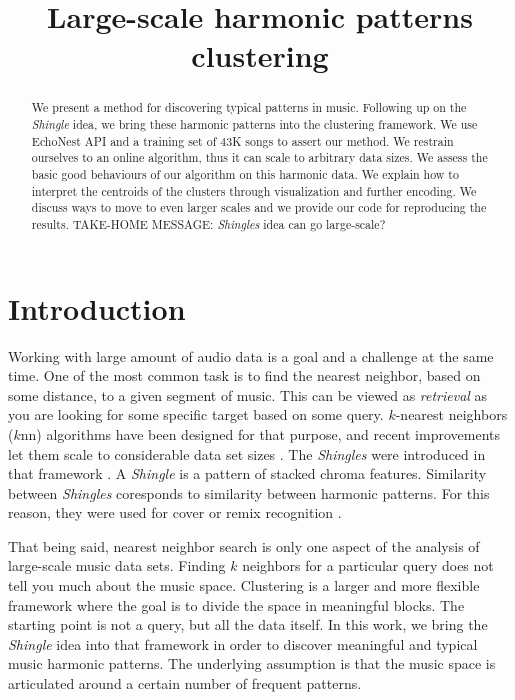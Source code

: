 \documentclass{article}
\title{Large-scale harmonic patterns clustering}
\begin{document}
%
\maketitle
%
\begin{abstract}
We present a method for discovering typical patterns in music.
Following up on the \textit{Shingle} idea, we bring these harmonic patterns
into the clustering framework. We use EchoNest API and a training set
of $43$K songs to assert our method. We restrain ourselves to an online
algorithm, thus it can scale to arbitrary data sizes.
We assess the basic good behaviours of our algorithm on this harmonic
data. We explain how to interpret the centroids of the clusters through
visualization and further encoding. We discuss ways to move to even larger
scales and we provide our code for reproducing the results.
TAKE-HOME MESSAGE: \textit{Shingles} idea can go large-scale?
\end{abstract}
%
\section{Introduction}\label{sec:introduction}

Working with large amount of audio data is a goal and a challenge at the
same time. One of the most common task is to find the nearest neighbor,
based on some distance, to a given segment of music. This can be viewed
as \textit{retrieval} as you are looking for some specific target
based on some query. $k$-nearest neighbors ($k$nn) algorithms have been
designed for that purpose, and recent improvements let them scale to
considerable data set sizes \cite{Datar2004}. The \textit{Shingles}
were introduced in that framework \cite{Casey2006}. A \textit{Shingle}
is a pattern of stacked chroma features. Similarity between
\textit{Shingles} coresponds to similarity between harmonic patterns. For this
reason, they were used for cover or remix recognition \cite{Casey2007}.

That being said, nearest neighbor search is only one aspect of the
analysis of large-scale music data sets. Finding $k$ neighbors for a
particular query does not tell you much about the music space.
Clustering is a larger and more flexible framework where the goal is
to divide the space in meaningful blocks. The starting point is not
a query, but all the data itself. In this work, we bring the
\textit{Shingle} idea into that framework in order to discover
meaningful and typical music harmonic patterns. The underlying assumption
is that the music space is articulated around a certain number of
frequent patterns.
\end{document}
